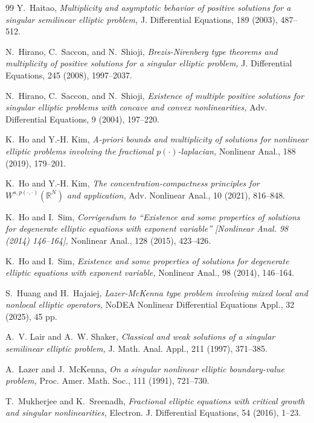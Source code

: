 \documentclass[11pt]{article}
\newcommand{\rnn}{\mathbb{R}^{N}}
\begin{document}
\begin{thebibliography}{99}
Y.~Haitao,
{\it Multiplicity and asymptotic behavior of positive solutions for a
  singular semilinear elliptic problem,}
J. Differential Equations, 189 (2003), 487--512.

N.~Hirano, C.~Saccon, and N.~Shioji,
{\it Brezis-{N}irenberg type theorems and multiplicity of positive
  solutions for a singular elliptic problem,}
J. Differential Equations, 245 (2008), 1997--2037.

N.~Hirano, C.~Saccon, and N.~Shioji,
{\it {Existence of multiple positive solutions for singular elliptic
  problems with concave and convex nonlinearities},}
Adv. Differential Equations, 9 (2004), 197--220.

K.~Ho and Y.-H. Kim,
{\it A-priori bounds and multiplicity of solutions for nonlinear elliptic
  problems involving the fractional $p(\cdot)$-laplacian,}
Nonlinear Anal., 188 (2019), 179--201.

K.~Ho and Y.-H. Kim,
{\it The concentration-compactness principles for
  {$W^{s,p(\cdot,\cdot)}(\rnn)$} and application,}
Adv. Nonlinear Anal., 10 (2021), 816--848.

K.~Ho and I.~Sim,
{\it Corrigendum to “{E}xistence and some properties of solutions for
  degenerate elliptic equations with exponent variable'' [{N}onlinear {A}nal.
  98 (2014) 146–164],}
Nonlinear Anal., 128 (2015), 423--426.

K.~Ho and I.~Sim,
{\it Existence and some properties of solutions for degenerate elliptic
  equations with exponent variable,}
Nonlinear Anal., 98 (2014), 146--164.

S.~Huang and H.~Hajaiej,
{\it Lazer-{M}c{K}enna type problem involving mixed local and nonlocal
  elliptic operators,}
NoDEA Nonlinear Differential Equations Appl., 32 (2025), 45 pp.

A.~V. Lair and A.~W. Shaker,
{\it Classical and weak solutions of a singular semilinear elliptic
  problem,}
J. Math. Anal. Appl., 211 (1997), 371--385.

A.~Lazer and J.~McKenna,
{\it On a singular nonlinear elliptic boundary-value problem,}
Proc. Amer. Math. Soc., 111 (1991), 721--730.

T.~Mukherjee and K.~Sreenadh,
{\it Fractional elliptic equations with critical growth and singular
  nonlinearities,}
Electron. J. Differential Equations, 54 (2016), 1--23.


\end{thebibliography}
\end{document}
